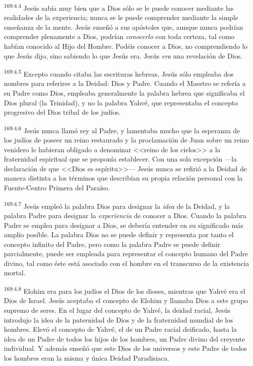 \par 
\textsuperscript{169:4.4} Jesús sabía muy bien que a Dios sólo se le puede conocer mediante las realidades de la experiencia; nunca se le puede comprender mediante la simple enseñanza de la mente. Jesús enseñó a sus apóstoles que, aunque nunca podrían comprender plenamente a Dios, podrían \textit{conocerlo} con toda certeza, tal como habían conocido al Hijo del Hombre. Podéis conocer a Dios, no comprendiendo lo que Jesús dijo, sino sabiendo lo que Jesús era. Jesús \textit{era} una revelación de Dios.

\par 
\textsuperscript{169:4.5} Excepto cuando citaba las escrituras hebreas, Jesús sólo empleaba dos nombres para referirse a la Deidad: Dios y Padre. Cuando el Maestro se refería a su Padre como Dios, empleaba generalmente la palabra hebrea que significaba el Dios plural (la Trinidad), y no la palabra Yahvé, que representaba el concepto progresivo del Dios tribal de los judíos.

\par 
\textsuperscript{169:4.6} Jesús nunca llamó rey al Padre, y lamentaba mucho que la esperanza de los judíos de poseer un reino restaurado y la proclamación de Juan sobre un reino venidero le hubieran obligado a denominar <<reino de los cielos>> a la fraternidad espiritual que se proponía establecer. Con una sola excepción ---la declaración de que <<Dios es espíritu>>--- Jesús nunca se refirió a la Deidad de manera distinta a los términos que describían su propia relación personal con la Fuente-Centro Primera del Paraíso.

\par 
\textsuperscript{169:4.7} Jesús empleó la palabra Dios para designar la \textit{idea} de la Deidad, y la palabra Padre para designar la \textit{experiencia} de conocer a Dios. Cuando la palabra Padre se emplea para designar a Dios, se debería entender en su significado más amplio posible. La palabra Dios no se puede definir y representa por tanto el concepto infinito del Padre, pero como la palabra Padre se puede definir parcialmente, puede ser empleada para representar el concepto humano del Padre divino, tal como éste está asociado con el hombre en el transcurso de la existencia mortal.

\par 
\textsuperscript{169:4.8} Elohim era para los judíos el Dios de los dioses, mientras que Yahvé era el Dios de Israel. Jesús aceptaba el concepto de Elohim y llamaba Dios a este grupo supremo de seres. En el lugar del concepto de Yahvé, la deidad racial, Jesús introdujo la idea de la paternidad de Dios y de la fraternidad mundial de los hombres. Elevó el concepto de Yahvé, el de un Padre racial deificado, hasta la idea de un Padre de todos los hijos de los hombres, un Padre divino del creyente individual. Y además enseñó que este Dios de los universos y este Padre de todos los hombres eran la misma y única Deidad Paradisiaca.

